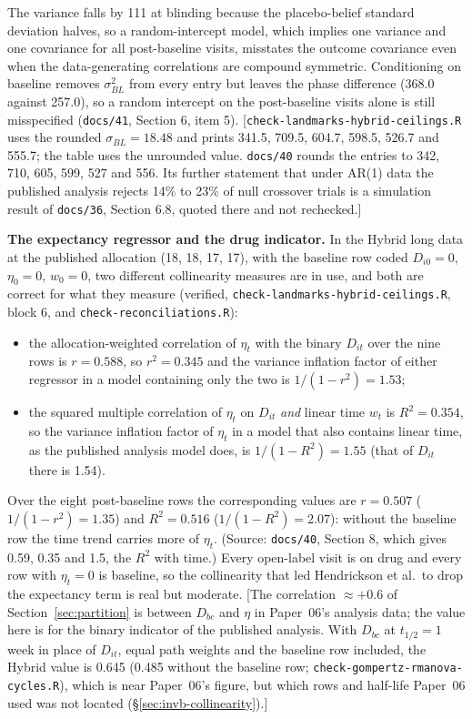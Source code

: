 \documentclass[11pt]{article}
\newcommand{\note}[1]{\textcolor{blue!60!black}{\small [#1]}}
\newcommand{\code}[1]{\texttt{#1}}
\begin{document}
\noindent The variance falls by 111 at blinding because the
placebo-belief standard deviation halves, so a random-intercept model,
which implies one variance and one covariance for all post-baseline
visits, misstates the outcome covariance even when the data-generating
correlations are compound symmetric. Conditioning on baseline removes
$\sigma_{BL}^2$ from every entry but leaves the phase difference
(368.0 against 257.0), so a random intercept on the post-baseline
visits alone is still misspecified (\code{docs/41}, Section 6, item 5).
\note{\code{check-landmarks-hybrid-ceilings.R} uses the rounded $\sigma_{BL} = 18.48$ and
prints 341.5, 709.5, 604.7, 598.5, 526.7 and 555.7; the table uses the
unrounded value. \code{docs/40} rounds the
entries to 342, 710, 605, 599, 527 and 556. Its further statement that
under AR(1) data the published analysis rejects 14\% to 23\% of null
crossover trials is a simulation result of \code{docs/36}, Section 6.8,
quoted there and not rechecked.}

\textbf{The expectancy regressor and the drug indicator.} In the
Hybrid long data at the published allocation (18, 18, 17, 17), with
the baseline row coded $D_{i0} = 0$, $\eta_0 = 0$, $w_0 = 0$, two
different collinearity measures are in use, and both are correct for
what they measure (verified, \code{check-landmarks-hybrid-ceilings.R}, block 6, and
\code{check-reconciliations.R}):
\begin{itemize}[itemsep=1pt]
\item the allocation-weighted correlation of $\eta_t$ with the binary
  $D_{it}$ over the nine rows is $r = 0.588$, so $r^2 = 0.345$ and the
  variance inflation factor of either regressor in a model containing
  only the two is $1/(1 - r^2) = 1.53$;
\item the squared multiple correlation of $\eta_t$ on $D_{it}$
  \emph{and} linear time $w_t$ is $R^2 = 0.354$, so the variance
  inflation factor of $\eta_t$ in a model that also contains linear
  time, as the published analysis model does, is $1/(1 - R^2) = 1.55$
  (that of $D_{it}$ there is 1.54).
\end{itemize}
Over the eight post-baseline rows the corresponding values are
$r = 0.507$ ($1/(1 - r^2) = 1.35$) and $R^2 = 0.516$ ($1/(1 - R^2) =
2.07$): without the baseline row the time trend carries more of
$\eta_t$. (Source: \code{docs/40}, Section 8, which gives 0.59, 0.35
and 1.5, the $R^2$ with time.) Every open-label visit is on drug and
every row with $\eta_t = 0$ is baseline, so the collinearity that led
Hendrickson et al.\ to drop the expectancy term is real but moderate.
\note{The correlation $\approx +0.6$ of Section~\ref{sec:partition} is
between $D_{bc}$ and $\eta$ in Paper~06's analysis data; the value here
is for the binary indicator of the published analysis. With $D_{bc}$ at
$t_{1/2} = 1$ week in place of $D_{it}$, equal path weights and the
baseline row included, the Hybrid value is 0.645 (0.485 without the
baseline row; \code{check-gompertz-rmanova-cycles.R}), which is near Paper~06's figure,
but which rows and half-life Paper~06 used was not located
(\S\ref{sec:invb-collinearity}).}
\end{document}
